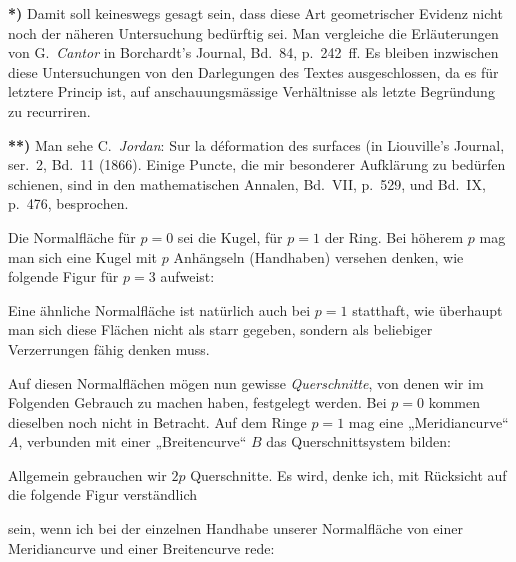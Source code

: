 \documentclass{article}
\begin{document}
\textbf{*)} Damit soll keineswegs gesagt sein, dass diese Art geometrischer Evidenz nicht noch der näheren Untersuchung bedürftig sei. Man vergleiche die Erläuterungen von G.\ \emph{Cantor} in Borchardt's Journal, Bd.~84, p.~242~ff. Es bleiben inzwischen diese Untersuchungen von den Darlegungen des Textes ausgeschlossen, da es für letztere Princip ist, auf anschauungsmässige Verhältnisse als letzte Begründung zu recurriren.

\textbf{**)} Man sehe C.\ \emph{Jordan}: Sur la déformation des surfaces (in Liouville's Journal, ser.~2, Bd.~11 (1866). Einige Puncte, die mir besonderer Aufklärung zu bedürfen schienen, sind in den mathematischen Annalen, Bd.~VII, p.~529, und Bd.~IX, p.~476, besprochen.


Die Normalfläche für $p = 0$ sei die Kugel, für $p = 1$ der Ring. Bei höherem $p$ mag man sich eine Kugel mit $p$ Anhängseln (Handhaben) versehen denken, wie folgende Figur für $p = 3$ aufweist:


Eine ähnliche Normalfläche ist natürlich auch bei $p = 1$ statthaft, wie überhaupt man sich diese Flächen nicht als starr gegeben, sondern als beliebiger Verzerrungen fähig denken muss.

Auf diesen Normalflächen mögen nun gewisse \emph{Querschnitte}, von denen wir im Folgenden Gebrauch zu machen haben, festgelegt werden. Bei $p = 0$ kommen dieselben noch nicht in Betracht. Auf dem Ringe $p = 1$ mag eine „Meridiancurve“ $A$, verbunden mit einer „Breitencurve“ $B$ das Querschnittsystem bilden:


Allgemein gebrauchen wir $2p$ Querschnitte. Es wird, denke ich, mit Rücksicht auf die folgende Figur verständlich

sein, wenn ich bei der einzelnen Handhabe unserer Normalfläche von einer Meridiancurve und einer Breitencurve rede:
\end{document}
